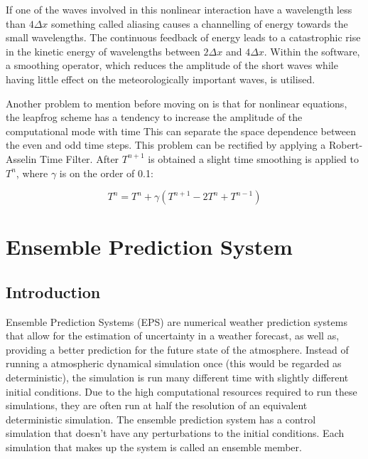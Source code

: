 If one of the waves involved in this nonlinear interaction have a wavelength less than $4 \Delta x$ something called aliasing causes a channelling of energy towards the small wavelengths. The continuous feedback of energy leads to a catastrophic rise in the kinetic energy of wavelengths between $2 \Delta x$ and $4 \Delta x$. Within the software, a smoothing operator, which reduces the amplitude of the short waves while having little effect on the meteorologically important waves, is utilised\cite{nonlinear_instability}.

Another problem to mention before moving on is that for nonlinear equations, the leapfrog scheme has a tendency to increase the amplitude of the computational mode with time This can separate the space dependence between the even and odd time steps. This problem can be rectified by applying a Robert-Asselin Time Filter. After $T^{n+1}$ is obtained a slight time smoothing is applied to $T^{n}$, where $\gamma$ is on the order of 0.1\cite{leapfrog_slides_two}:

\begin{equation}
    T^{n} = T^{n} + \gamma(T^{n+1} - 2 T^{n} + T^{n-1})
\end{equation}

\section{Ensemble Prediction System}
\subsection{Introduction}
Ensemble Prediction Systems (EPS) are numerical weather prediction systems that allow for the estimation of uncertainty in a weather forecast, as well as, providing a better prediction for the future state of the atmosphere. Instead of running a atmospheric dynamical simulation once (this would be regarded as deterministic), the simulation is run many different time with slightly different initial conditions. Due to the high computational resources required to run these simulations, they are often run at half the resolution of an equivalent deterministic simulation. The ensemble prediction system has a control simulation that doesn't have any perturbations to the initial conditions. Each simulation that makes up the system is called an ensemble member\cite{intro_efs}.

